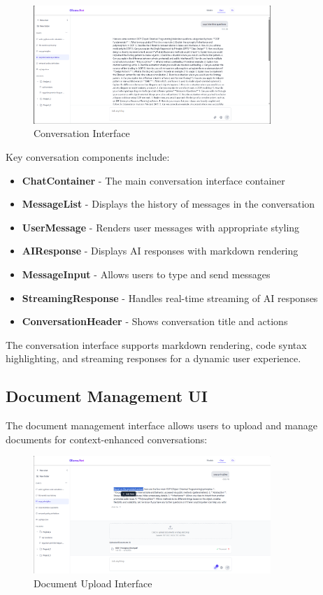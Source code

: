 \begin{figure}[h]
    \centering
    \includegraphics[width=0.8\textwidth]{./Chapter07/figures/conversation_ui.png}
    \caption{Conversation Interface}
    \label{fig:conversation-ui}
\end{figure}

Key conversation components include:

\begin{itemize}
  \item \textbf{ChatContainer} - The main conversation interface container
  \item \textbf{MessageList} - Displays the history of messages in the conversation
  \item \textbf{UserMessage} - Renders user messages with appropriate styling
  \item \textbf{AIResponse} - Displays AI responses with markdown rendering
  \item \textbf{MessageInput} - Allows users to type and send messages
  \item \textbf{StreamingResponse} - Handles real-time streaming of AI responses
  \item \textbf{ConversationHeader} - Shows conversation title and actions
\end{itemize}

The conversation interface supports markdown rendering, code syntax highlighting, and streaming responses for a dynamic user experience.

\subsection{Document Management UI}

The document management interface allows users to upload and manage documents for context-enhanced conversations:

\begin{figure}[h]
    \centering
    \includegraphics[width=0.8\textwidth]{./Chapter07/figures/document_upload_ui.png}
    \caption{Document Upload Interface}
    \label{fig:document-upload-ui}
\end{figure}

